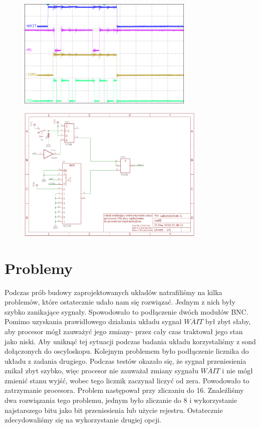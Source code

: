 \documentclass[fleqn]{article}
\begin{document}
\begin{figure}[H]
	\centering
	\includegraphics[width=0.75\textwidth]{img/3c.png}
	\caption{}
\end{figure}

\begin{figure}[H]
	\centering
	\includegraphics[width=0.8\textwidth]{img/z3.png}
	\caption{}
\end{figure}

\section{Problemy}

Podczas prób budowy zaprojektowanych układów natrafiliśmy na kilka problemów, które ostatecznie udało nam się rozwiązać.
Jednym z nich były szybko zanikające sygnały. Spowodowało to podłączenie dwóch modułów BNC. Pomimo uzyskania prawidłowego działania układu sygnał $\overline{WAIT}$ był zbyt słaby, aby procesor mógł zauważyć jego zmiany- przez cały czas traktował jego stan jako niski. Aby uniknąć tej sytuacji podczas badania układu korzystaliśmy z sond dołączonych do oscyloskopu.
Kolejnym problemem było podłączenie licznika do układu z zadania drugiego. Podczas testów okazało się, że sygnał przeniesienia znikał zbyt szybko, więc procesor nie zauważał zmiany sygnału $\overline{WAIT}$ i nie mógł zmienić stanu wyjść, wobec tego licznik zaczynał liczyć od zera. Powodowało to zatrzymanie procesora. Problem następował przy zliczaniu do 16. Znaleźliśmy dwa rozwiązania tego problemu, jednym było zliczanie do 8 i wykorzystanie najstarszego bitu jako bit przeniesienia lub użycie rejestru. Ostatecznie zdecydowaliśmy się na wykorzystanie drugiej opcji.
\end{document}

